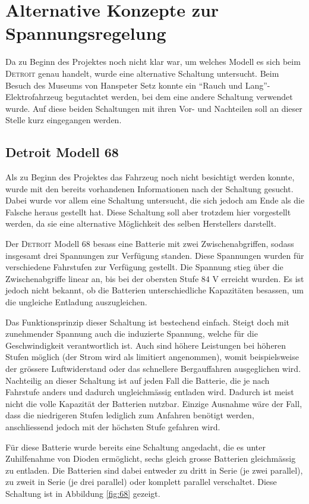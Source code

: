 \section{Alternative Konzepte zur Spannungsregelung}
Da zu Beginn des Projektes noch nicht klar war, um welches Modell es sich beim \textsc{Detroit} genau handelt, wurde eine alternative Schaltung untersucht. Beim Besuch des Museums von Hanspeter Setz konnte ein "`Rauch und Lang"'-Elektrofahrzeug begutachtet werden, bei dem eine andere Schaltung verwendet wurde. Auf diese beiden Schaltungen mit ihren Vor- und Nachteilen soll an dieser Stelle kurz eingegangen werden.

\subsection{Detroit Modell 68}
Als zu Beginn des Projektes das Fahrzeug noch nicht besichtigt werden konnte, wurde mit den bereits vorhandenen Informationen nach der Schaltung gesucht. Dabei wurde vor allem eine Schaltung untersucht, die sich jedoch am Ende als die Falsche heraus gestellt hat. Diese Schaltung soll aber trotzdem hier vorgestellt werden, da sie eine alternative Möglichkeit des selben Herstellers darstellt.

Der \textsc{Detroit} Modell 68 besass eine Batterie mit zwei Zwischenabgriffen, sodass insgesamt drei Spannungen zur Verfügung standen. Diese Spannungen wurden für verschiedene Fahrstufen zur Verfügung gestellt. Die Spannung stieg über die Zwischenabgriffe linear an, bis bei der obersten Stufe $84$ V erreicht wurden. Es ist jedoch nicht bekannt, ob die Batterien unterschiedliche Kapazitäten besassen, um die ungleiche Entladung auszugleichen.

Das Funktionsprinzip dieser Schaltung ist bestechend einfach. Steigt doch mit zunehmender Spannung auch die induzierte Spannung, welche für die Geschwindigkeit verantwortlich ist. Auch sind höhere Leistungen bei höheren Stufen möglich (der Strom wird als limitiert angenommen), womit beispielsweise der grössere Luftwiderstand oder das schnellere Bergauffahren ausgeglichen wird. Nachteilig an dieser Schaltung ist auf jeden Fall die Batterie, die je nach Fahrstufe anders und dadurch ungleichmässig entladen wird. Dadurch ist meist nicht die volle Kapazität der Batterien nutzbar. Einzige Ausnahme wäre der Fall, dass die niedrigeren Stufen lediglich zum Anfahren benötigt werden, anschliessend jedoch mit der höchsten Stufe gefahren wird.

Für diese Batterie wurde bereits eine Schaltung angedacht, die es unter Zuhilfenahme von Dioden ermöglicht, sechs gleich grosse Batterien gleichmässig zu entladen. Die Batterien sind dabei entweder zu dritt in Serie (je zwei parallel), zu zweit in Serie (je drei parallel) oder komplett parallel verschaltet. Diese Schaltung ist in Abbildung \ref{fig:68} gezeigt.

